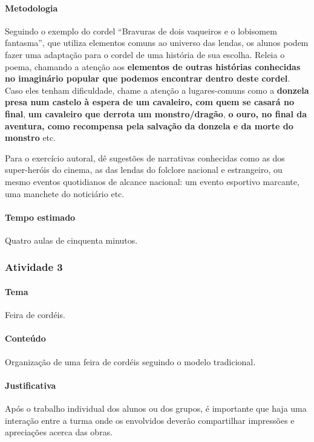 \documentclass[11pt]{extarticle}
\begin{document}
\paragraph{Metodologia} 
Seguindo o exemplo do cordel ``Bravuras de dois vaqueiros e o lobisomem 
fantasma'', que utiliza elementos comuns ao universo das lendas, os alunos 
podem fazer uma adaptação para o cordel de uma história de sua escolha.
Releia o poema, chamando a atenção aos \textbf{elementos de outras histórias conhecidas 
no imaginário popular que podemos encontrar dentro deste cordel}. Caso eles 
tenham dificuldade, chame a atenção a lugares-comuns  como a \textbf{donzela presa 
num castelo à espera de um cavaleiro, com quem se casará no final}, \textbf{um cavaleiro 
que derrota um monstro/dragão}, \textbf{o ouro, no final da aventura, como recompensa pela salvação da donzela 
e da morte do monstro} etc.

Para o exercício autoral, dê sugestões de narrativas conhecidas como as 
dos super-heróis do cinema, as das lendas do folclore nacional e 
estrangeiro, ou mesmo eventos quotidianos de alcance nacional: 
um evento esportivo marcante, uma manchete do noticiário etc.

\paragraph{Tempo estimado} Quatro aulas de cinquenta minutos.


\subsubsection{Atividade 3}


\paragraph{Tema} Feira de cordéis.

\paragraph{Conteúdo} Organização de uma feira de cordéis seguindo o modelo tradicional.

\paragraph{Justificativa} Após o trabalho individual dos alunos ou dos grupos,
é importante que haja uma interação entre a turma onde os envolvidos
deverão compartilhar impressões e apreciações acerca das obras.
\end{document}

